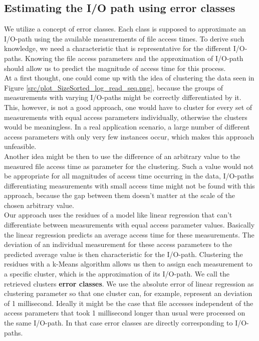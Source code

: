 \documentclass{superfri}
\begin{document}
\subsection{Estimating the I/O path using error classes}
\label{sec:error_classes}
We utilize a concept of error classes.
Each class is supposed to approximate an I/O-path using the available measurements of file access times.
To derive such knowledge, we need a characteristic that is representative for the different I/O-paths. 
Knowing the file access parameters and the approximation of I/O-path should allow us to predict the magnitude of access time for this process.\\
At a first thought, one could come up with the idea of clustering the data seen in Figure \ref{src/plot_SizeSorted_log_read_seq.png}, because the groups of measurements with varying I/O-paths might be correctly differentiated by it. 
This, however, is not a good approach, one would have to cluster for every set of measurements with equal access parameters individually, otherwise the clusters would be meaningless. 
In a real application scenario, a large number of different access parameters with only very few instances occur, which makes this approach unfeasible.\\
Another idea might be then to use the difference of an arbitrary value to the measured file access time as parameter for the clustering. 
Such a value would not be appropriate for all magnitudes of access time occurring in the data, I/O-paths differentiating measurements with small access time might not be found with this approach, because the gap between them doesn't matter at the scale of the chosen arbitrary value.\\
Our approach uses the residues of a model like linear regression that can't differentiate between measurements with equal access parameter values.
Basically the linear regression predicts an average access time for these measurements.
The deviation of an individual measurement for these access parameters to the predicted average value is then characteristic for the I/O-path.
Clustering the residues with a k-Means algorithm allows us then to assign each measurement to a specific cluster, which is the approximation of its I/O-path.
We call the retrieved clusters \textbf{error classes}.
We use the absolute error of linear regression as clustering parameter so that one cluster can, for example, represent an deviation of 1 millisecond.
Ideally it might be the case that file accesses independent of the access parameters that took 1 millisecond longer than usual were processed on the same I/O-path.
In that case error classes are directly corresponding to I/O-paths. \medskip
\end{document}
